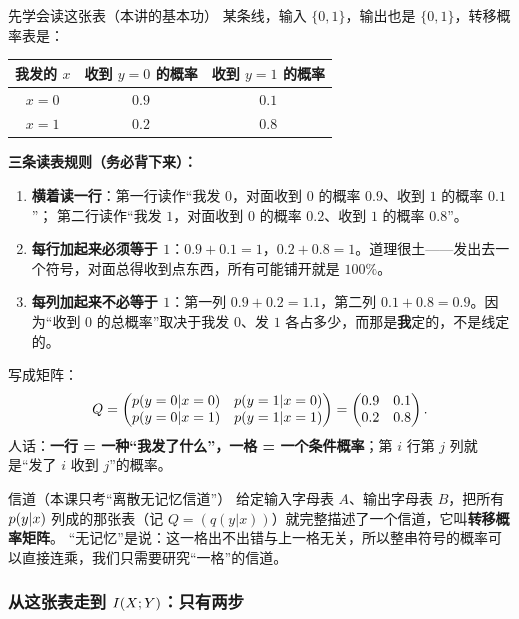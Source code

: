 \begin{calc}{先学会读这张表（本讲的基本功）}
某条线，输入 $\{0,1\}$，输出也是 $\{0,1\}$，转移概率表是：
\begin{center}
\begin{tabular}{ccc}
\toprule
我发的 $x$ & 收到 $y=0$ 的概率 & 收到 $y=1$ 的概率 \\
\midrule
$x=0$ & $0.9$ & $0.1$ \\
$x=1$ & $0.2$ & $0.8$ \\
\bottomrule
\end{tabular}
\end{center}

\textbf{三条读表规则（务必背下来）：}
\begin{enumerate}[leftmargin=1.8em,itemsep=2pt]
  \item \textbf{横着读一行}：第一行读作“我发 $0$，对面收到 $0$ 的概率 $0.9$、收到 $1$ 的概率 $0.1$”；
        第二行读作“我发 $1$，对面收到 $0$ 的概率 $0.2$、收到 $1$ 的概率 $0.8$”。
  \item \textbf{每行加起来必须等于 $1$}：$0.9+0.1=1$，$0.2+0.8=1$。道理很土——发出去一个符号，对面总得收到点东西，所有可能铺开就是 $100\%$。
  \item \textbf{每列加起来不必等于 $1$}：第一列 $0.9+0.2=1.1$，第二列 $0.1+0.8=0.9$。因为“收到 $0$ 的总概率”取决于我发 $0$、发 $1$ 各占多少，而那是\textbf{我}定的，不是线定的。
\end{enumerate}

写成矩阵：
\[
Q=\begin{pmatrix}
p\!\left(y=0|x=0\right) & p\!\left(y=1|x=0\right)\\
p\!\left(y=0|x=1\right) & p\!\left(y=1|x=1\right)
\end{pmatrix}
=\begin{pmatrix} 0.9 & 0.1\\ 0.2 & 0.8\end{pmatrix}.
\]
人话：\textbf{一行 = 一种“我发了什么”，一格 = 一个条件概率}；第 $i$ 行第 $j$ 列就是“发了 $i$ 收到 $j$”的概率。
\end{calc}

\begin{defbox}{信道（本课只考“离散无记忆信道”）}
给定输入字母表 $A$、输出字母表 $B$，把所有 $p\!\left(y|x\right)$ 列成的那张表（记 $Q=(q(y|x))$）就完整描述了一个信道，它叫\textbf{转移概率矩阵}。
“无记忆”是说：这一格出不出错与上一格无关，所以整串符号的概率可以直接连乘，我们只需要研究“一格”的信道。
\end{defbox}

\subsubsection{从这张表走到 $I\!\left(X;Y\right)$：只有两步}

